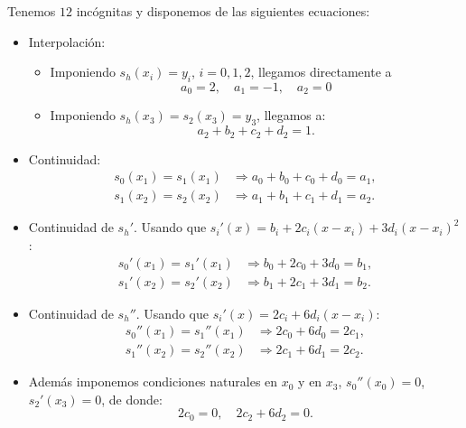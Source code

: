 Tenemos $12$ incógnitas y disponemos de las siguientes ecuaciones:
\begin{itemize}
\item Interpolación:
  \begin{itemize}
  \item Imponiendo $s_h(x_i)=y_i$, $i=0,1,2$, llegamos directamente
    a
    \begin{equation*}
      a_0=2, \quad a_1=-1, \quad a_2=0
    \end{equation*}
  \item Imponiendo $s_h(x_3)=s_2(x_3)=y_3$, llegamos a:
    \begin{equation*}
      a_2+b_2+c_2+d_2=1.
    \end{equation*}
  \end{itemize}
\item Continuidad:
  \begin{align*}
   s_0(x_1)=s_1(x_1) &\Rightarrow a_0+b_0+c_0+d_0 = a_1,
   \\
   s_1(x_2)=s_2(x_2) &\Rightarrow a_1+b_1+c_1+d_1 = a_2.
  \end{align*}
\item Continuidad de $s_h'$. Usando que
  $s_i'(x)=b_i+2c_i(x-x_i)+3d_i(x-x_i)^2$:
  \begin{align*}
   s_0'(x_1)=s_1'(x_1) &\Rightarrow b_0+2c_0+3d_0 = b_1,
   \\
   s_1'(x_2)=s_2'(x_2) &\Rightarrow b_1+2c_1+3d_1 = b_2.
  \end{align*}
\item Continuidad de $s_h''$. Usando que
  $s_i'(x)=2c_i+6d_i(x-x_i)$:
  \begin{align*}
   s_0''(x_1)=s_1''(x_1) &\Rightarrow 2c_0+6d_0 = 2c_1,
   \\
   s_1''(x_2)=s_2''(x_2) &\Rightarrow 2c_1+6d_1 = 2c_2.
  \end{align*}
\item Además imponemos condiciones naturales en $x_0$ y en $x_3$,
  $s_0''(x_0)=0$, $s_2'(x_3)=0$, de donde:
  \begin{equation*}
   2c_0 = 0, \quad 2c_2 + 6 d_2 =0.
  \end{equation*}
\end{itemize}

